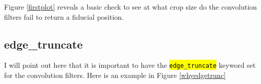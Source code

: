 \documentclass[10pt]{scrartcl}
\begin{document}

Figure \ref{firstplot} reveals a basic check to see at what crop size do the convolution filters fail to return a fiducial position. 

\subsection{edge\_truncate} %
\label{sub:edge_truncate}
I will point out here that it is important to have the \hl{\texttt{edge\_truncate}} keyword set for the convolution filters. Here is an example in Figure \ref{whyedgetrunc}
\end{document}
